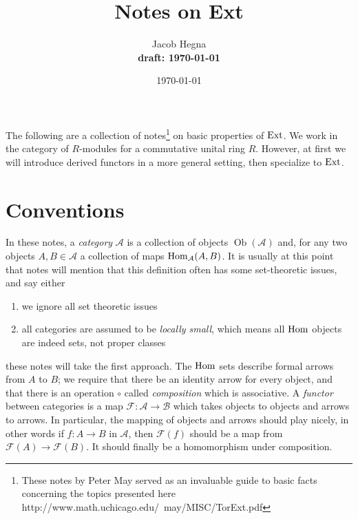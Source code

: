

\usepackage[utf8]{inputenc}
\usepackage{mathtools}
\usepackage{multirow}
\usepackage{graphicx}
\usepackage{caption}
\usepackage{tikz-cd}


\graphicspath{ {src/images/} }



\title{Notes on Ext}
\author{Jacob Hegna \\ \textbf{draft: \today}}
\date{\today}

\maketitle

The following are a collection of notes\footnote{These notes by Peter May served as an invaluable guide to basic facts concerning the topics presented here http://www.math.uchicago.edu/~may/MISC/TorExt.pdf} on basic properties of $\operatorname{Ext}$. We work in the category of $R$-modules for a commutative unital ring $R$. However, at first we will introduce derived functors in a more general setting, then specialize to $\operatorname{Ext}$.

\tableofcontents

\section{Conventions}

In these notes, a \textit{category} $\mathcal{A}$ is a collection of objects $\mathop{Ob}(\mathcal{A})$ and, for any two objects $A, B \in \mathcal{A}$ a collection of maps $\operatorname{Hom}_\mathcal{A}(A, B)$. It is usually at this point that notes will mention that this definition often has some set-theoretic issues, and say either
\begin{enumerate}
    \item we ignore all set theoretic issues
    \item all categories are assumed to be \textit{locally small}, which means all $\operatorname{Hom}$ objects are indeed sets, not proper classes
\end{enumerate}
these notes will take the first approach. The $\operatorname{Hom}$ sets describe formal arrows from $A$ to $B$; we require that there be an identity arrow for every object, and that there is an operation $\circ$ called \textit{composition} which is associative. A \textit{functor} between categories is a map $\mathcal{F} : \mathcal{A} \to \mathcal{B}$ which takes objects to objects and arrows to arrows. In particular, the mapping of objects and arrows should play nicely, in other words if $f : A \to B$ in $\mathcal{A}$, then $\mathcal{F}(f)$ should be a map from $\mathcal{F}(A) \to \mathcal{F}(B)$. It should finally be a homomorphism under composition.

